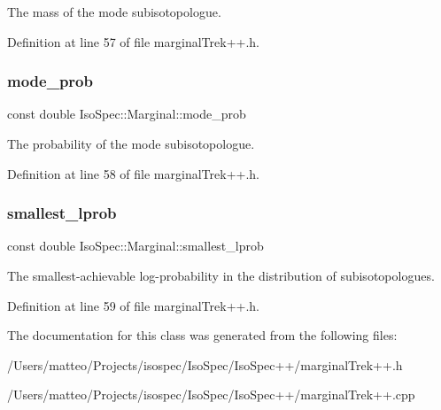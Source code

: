 The mass of the mode subisotopologue. 

Definition at line 57 of file marginal\+Trek++.\+h.

\mbox{\label{class_iso_spec_1_1_marginal_a75315ec4c470be5f82b903172f7c43ae}} 
\subsubsection{\texorpdfstring{mode\+\_\+prob}{mode\_prob}}
{\footnotesize\ttfamily const double Iso\+Spec\+::\+Marginal\+::mode\+\_\+prob\hspace{0.3cm}{\ttfamily [protected]}}

The probability of the mode subisotopologue. 

Definition at line 58 of file marginal\+Trek++.\+h.

\mbox{\label{class_iso_spec_1_1_marginal_a2abd05ba9351e21cd99e2783e26bd6dc}} 
\subsubsection{\texorpdfstring{smallest\+\_\+lprob}{smallest\_lprob}}
{\footnotesize\ttfamily const double Iso\+Spec\+::\+Marginal\+::smallest\+\_\+lprob\hspace{0.3cm}{\ttfamily [protected]}}

The smallest-\/achievable log-\/probability in the distribution of subisotopologues. 

Definition at line 59 of file marginal\+Trek++.\+h.



The documentation for this class was generated from the following files\+:\begin{DoxyCompactItemize}
\item 
/\+Users/matteo/\+Projects/isospec/\+Iso\+Spec/\+Iso\+Spec++/marginal\+Trek++.\+h\item 
/\+Users/matteo/\+Projects/isospec/\+Iso\+Spec/\+Iso\+Spec++/marginal\+Trek++.\+cpp\end{DoxyCompactItemize}
